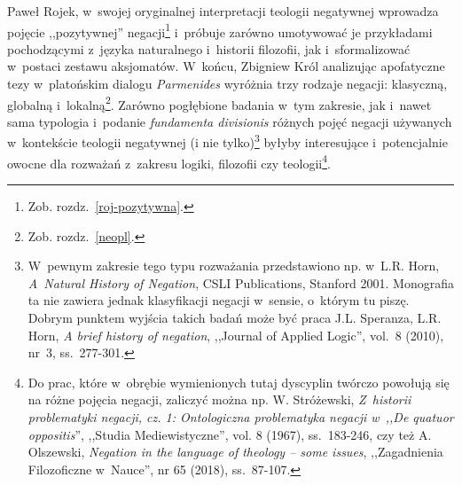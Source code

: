 \begin{enumerate}[label = \arabic*), itemindent=6mm, labelwidth=4mm, labelsep=2mm, itemsep=1em, leftmargin=0mm]
Paweł Rojek, w~swojej oryginalnej interpretacji teologii negatywnej wprowadza pojęcie ,,pozytywnej'' negacji\footnote{Zob. rozdz.~\ref{roj-pozytywna}.} i~próbuje zarówno umotywować je przykładami pochodzącymi z~języka naturalnego i~historii filozofii, jak i~sformalizować w~postaci zestawu aksjomatów. W~końcu, Zbigniew Król analizując apofatyczne tezy w~platońskim dialogu \textit{Parmenides} wyróżnia trzy rodzaje negacji: klasyczną, globalną i~lokalną\footnote{Zob. rozdz.~\ref{neopl}.}. Zarówno pogłębione badania w~tym zakresie, jak i~nawet sama typologia i~podanie \textit{fundamenta divisionis} różnych pojęć negacji używanych w~kontekście teologii negatywnej (i nie tylko)\footnote{W~pewnym zakresie tego typu rozważania przedstawiono np. w~L.R. Horn, \textit{A~Natural History of Negation}, CSLI Publications, Stanford 2001. Monografia ta nie zawiera jednak klasyfikacji negacji w~sensie, o~którym tu piszę. Dobrym punktem wyjścia takich badań może być praca J.L. Speranza, L.R. Horn, \textit{A brief history of negation}, ,,Journal of Applied Logic'', vol.~8 (2010), nr~3, ss.~277-301.} byłyby interesujące i~potencjalnie owocne dla rozważań z~zakresu logiki, filozofii czy teologii\footnote{Do prac, które w~obrębie wymienionych tutaj dyscyplin twórczo powołują się na różne pojęcia negacji, zaliczyć można np. W. Stróżewski, \textit{Z~historii problematyki negacji, cz. 1: Ontologiczna problematyka negacji w~,,De quatuor oppositis}'', ,,Studia Mediewistyczne'', vol. 8 (1967), ss.~183-246, czy też A. Olszewski, \textit{Negation in the language of theology -- some issues}, ,,Zagadnienia Filozoficzne w~Nauce'', nr 65 (2018), ss.~87-107.}.


\end{enumerate}
